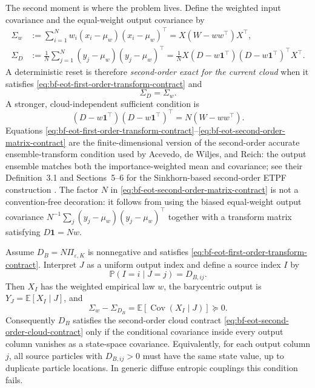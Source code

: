 The second moment is where the problem lives.  Define the weighted input
covariance and the equal-weight output covariance by
\begin{align}
\label{eq:bf-eot-weighted-covariance}
  \Sigma_w
  &:=
  \sum_{i=1}^N w_i(x_i-\mu_w)(x_i-\mu_w)^\top
  =
  X(W-ww^\top)X^\top,\\
\label{eq:bf-eot-transform-covariance}
  \Sigma_D
  &:=
  \frac1N\sum_{j=1}^N (y_j-\mu_w)(y_j-\mu_w)^\top
  =
  \frac1N X(D-w\mathbf 1^\top)(D-w\mathbf 1^\top)^\top X^\top.
\end{align}
A deterministic reset is therefore \emph{second-order exact for the current
cloud} when it satisfies \eqref{eq:bf-eot-first-order-transform-contract} and
\begin{equation}
\label{eq:bf-eot-second-order-cloud-contract}
  \Sigma_D=\Sigma_w.
\end{equation}
A stronger, cloud-independent sufficient condition is
\begin{equation}
\label{eq:bf-eot-second-order-matrix-contract}
  (D-w\mathbf 1^\top)(D-w\mathbf 1^\top)^\top
  =
  N(W-ww^\top).
\end{equation}
Equations
\eqref{eq:bf-eot-first-order-transform-contract}--\eqref{eq:bf-eot-second-order-matrix-contract}
are the finite-dimensional version of the second-order accurate ensemble-transform
condition used by Acevedo, de Wiljes, and Reich: the output ensemble matches both
the importance-weighted mean and covariance; see their Definition~3.1 and
Sections~5--6 for the Sinkhorn-based second-order ETPF construction
\citep{acevedodewiljesreich2017secondorder}.
The factor \(N\) in \eqref{eq:bf-eot-second-order-matrix-contract} is not a
convention-free decoration: it follows from using the biased equal-weight output
covariance \(N^{-1}\sum_j(y_j-\mu_w)(y_j-\mu_w)^\top\) together with a transform
matrix satisfying \(D\mathbf 1=Nw\).

\begin{proposition}
\label{prop:bf-eot-barycentric-not-second-order}
Assume \(D_B=N\Pi_{\varepsilon,K}\) is nonnegative and satisfies
\eqref{eq:bf-eot-first-order-transform-contract}.  Interpret \(J\) as a uniform
output index and define a source index \(I\) by
\[
  \mathbb P(I=i\mid J=j)=D_{B,ij}.
\]
Then \(X_I\) has the weighted empirical law \(w\), the barycentric output is
\(Y_J=\mathbb E[X_I\mid J]\), and
\begin{equation}
\label{eq:bf-eot-D-covariance-gap}
  \Sigma_w-\Sigma_{D_B}
  =
  \mathbb E\!\left[\operatorname{Cov}(X_I\mid J)\right]
  \succeq 0.
\end{equation}
Consequently \(D_B\) satisfies the second-order cloud contract
\eqref{eq:bf-eot-second-order-cloud-contract} only if the conditional covariance
inside every output column vanishes as a state-space covariance.  Equivalently,
for each output column \(j\), all source particles with \(D_{B,ij}>0\) must have
the same state value, up to duplicate particle locations.  In generic diffuse
entropic couplings this condition fails.
\end{proposition}

